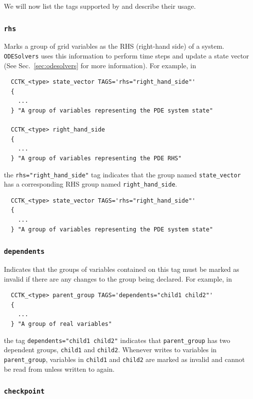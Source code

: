 We will now list the tags supported by \CarpetX\space and describe their usage.

\subsubsection{\texttt{rhs}}

Marks a group of grid variables as the RHS (right-hand side) of a system. \texttt{ODESolvers} uses this information to perform time steps and update a state vector (See Sec.~\ref{sec:odesolvers} for more information). For example, in
%
\begin{verbatim}
  CCTK_<type> state_vector TAGS='rhs="right_hand_side"'
  {
    ...
  } "A group of variables representing the PDE system state"

  CCTK_<type> right_hand_side
  {
    ...
  } "A group of variables representing the PDE RHS"
\end{verbatim}
%
the \texttt{rhs="right\_hand\_side"} tag indicates that the group named \texttt{state\_vector} has a corresponding RHS group named \texttt{right\_hand\_side}.

\begin{verbatim}
  CCTK_<type> state_vector TAGS='rhs="right_hand_side"'
  {
    ...
  } "A group of variables representing the PDE system state"
\end{verbatim}

\subsubsection{\texttt{dependents}}

Indicates that the groups of variables contained on this tag must be marked as invalid if there are any changes to the group being declared. For example, in
%
\begin{verbatim}
  CCTK_<type> parent_group TAGS='dependents="child1 child2"'
  {
    ...
  } "A group of real variables"
\end{verbatim}
%
the tag \texttt{dependents="child1 child2"} indicates that \texttt{parent\_group} has two dependent groups, \texttt{child1} and \texttt{child2}. Whenever \CarpetX\space writes to variables in \texttt{parent\_group}, variables in \texttt{child1} and \texttt{child2} are marked as invalid and cannot be read from unless written to again.

\subsubsection{\texttt{checkpoint}}

